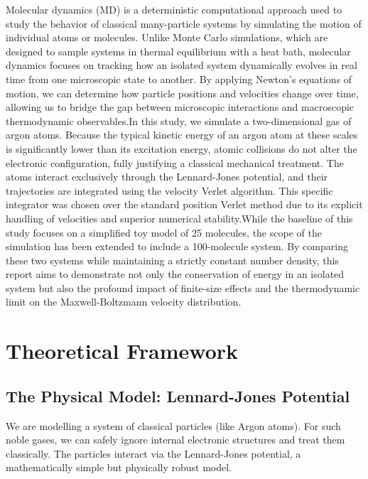 \documentclass[12pt, a4paper, oneside]{article}
\begin{document}
       Molecular dynamics (MD) is a deterministic computational approach used to study the behavior of classical many-particle systems by simulating the motion of individual atoms or molecules. Unlike Monte Carlo simulations, which are designed to sample systems in thermal equilibrium with a heat bath, molecular dynamics focuses on tracking how an isolated system dynamically evolves in real time from one microscopic state to another. By applying Newton's equations of motion, we can determine how particle positions and velocities change over time, allowing us to bridge the gap between microscopic interactions and macroscopic thermodynamic observables.In this study, we simulate a two-dimensional gas of argon atoms. Because the typical kinetic energy of an argon atom at these scales is significantly lower than its excitation energy, atomic collisions do not alter the electronic configuration, fully justifying a classical mechanical treatment. The atoms interact exclusively through the Lennard-Jones potential, and their trajectories are integrated using the velocity Verlet algorithm. This specific integrator was chosen over the standard position Verlet method due to its explicit handling of velocities and superior numerical stability.While the baseline of this study focuses on a simplified toy model of 25 molecules, the scope of the simulation has been extended to include a 100-molecule system. By comparing these two systems while maintaining a strictly constant number density, this report aims to demonstrate not only the conservation of energy in an isolated system but also the profound impact of finite-size effects and the thermodynamic limit on the Maxwell-Boltzmann velocity distribution.

    \section{Theoretical Framework}
        \subsection{The Physical Model: Lennard-Jones Potential}
        We are modelling a system of classical particles (like Argon atoms). For such noble gases, we can safely ignore internal electronic structures and treat them classically. The particles interact via the Lennard-Jones potential, a mathematically simple but physically robust model.
\end{document}
